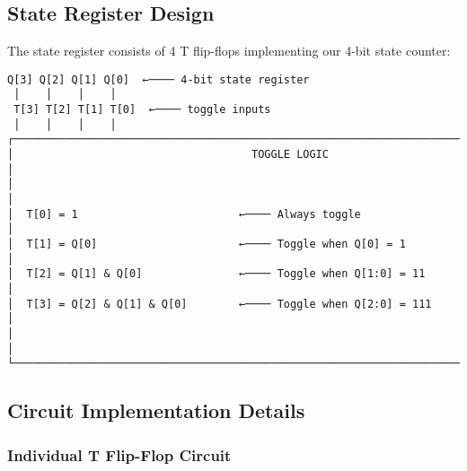 \documentclass[10pt,a4paper]{article}
\begin{document}
\subsection*{State Register Design}
The state register consists of 4 T flip-flops implementing our 4-bit state counter:

\begin{verbatim}
Q[3] Q[2] Q[1] Q[0]  ←──── 4-bit state register
 │    │    │    │
 T[3] T[2] T[1] T[0]  ←──── toggle inputs
 │    │    │    │
┌──────────────────────────────────────────────────────────────────────────────────────────────┐
│                                     TOGGLE LOGIC                                             │
│                                                                                              │
│  T[0] = 1                         ←──── Always toggle                                         │
│  T[1] = Q[0]                      ←──── Toggle when Q[0] = 1                                  │
│  T[2] = Q[1] & Q[0]               ←──── Toggle when Q[1:0] = 11                               │
│  T[3] = Q[2] & Q[1] & Q[0]        ←──── Toggle when Q[2:0] = 111                              │
│                                                                                              │
└──────────────────────────────────────────────────────────────────────────────────────────────┘
\end{verbatim}

\subsection*{Circuit Implementation Details}

\subsubsection*{Individual T Flip-Flop Circuit}
\begin{center}
\end{center}
\end{document}
